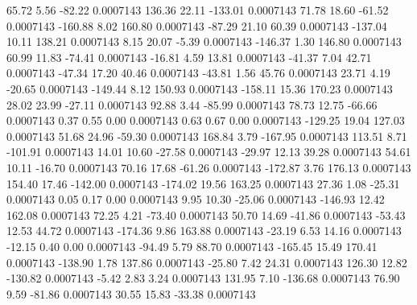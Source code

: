        65.72        5.56      -82.22     0.0007143
      136.36       22.11     -133.01     0.0007143
       71.78       18.60      -61.52     0.0007143
     -160.88        8.02      160.80     0.0007143
      -87.29       21.10       60.39     0.0007143
     -137.04       10.11      138.21     0.0007143
        8.15       20.07       -5.39     0.0007143
     -146.37        1.30      146.80     0.0007143
       60.99       11.83      -74.41     0.0007143
      -16.81        4.59       13.81     0.0007143
      -41.37        7.04       42.71     0.0007143
      -47.34       17.20       40.46     0.0007143
      -43.81        1.56       45.76     0.0007143
       23.71        4.19      -20.65     0.0007143
     -149.44        8.12      150.93     0.0007143
     -158.11       15.36      170.23     0.0007143
       28.02       23.99      -27.11     0.0007143
       92.88        3.44      -85.99     0.0007143
       78.73       12.75      -66.66     0.0007143
        0.37        0.55        0.00     0.0007143
        0.63        0.67        0.00     0.0007143
     -129.25       19.04      127.03     0.0007143
       51.68       24.96      -59.30     0.0007143
      168.84        3.79     -167.95     0.0007143
      113.51        8.71     -101.91     0.0007143
       14.01       10.60      -27.58     0.0007143
      -29.97       12.13       39.28     0.0007143
       54.61       10.11      -16.70     0.0007143
       70.16       17.68      -61.26     0.0007143
     -172.87        3.76      176.13     0.0007143
      154.40       17.46     -142.00     0.0007143
     -174.02       19.56      163.25     0.0007143
       27.36        1.08      -25.31     0.0007143
        0.05        0.17        0.00     0.0007143
        9.95       10.30      -25.06     0.0007143
     -146.93       12.42      162.08     0.0007143
       72.25        4.21      -73.40     0.0007143
       50.70       14.69      -41.86     0.0007143
      -53.43       12.53       44.72     0.0007143
     -174.36        9.86      163.88     0.0007143
      -23.19        6.53       14.16     0.0007143
      -12.15        0.40        0.00     0.0007143
      -94.49        5.79       88.70     0.0007143
     -165.45       15.49      170.41     0.0007143
     -138.90        1.78      137.86     0.0007143
      -25.80        7.42       24.31     0.0007143
      126.30       12.82     -130.82     0.0007143
       -5.42        2.83        3.24     0.0007143
      131.95        7.10     -136.68     0.0007143
       76.90        9.59      -81.86     0.0007143
       30.55       15.83      -33.38     0.0007143
